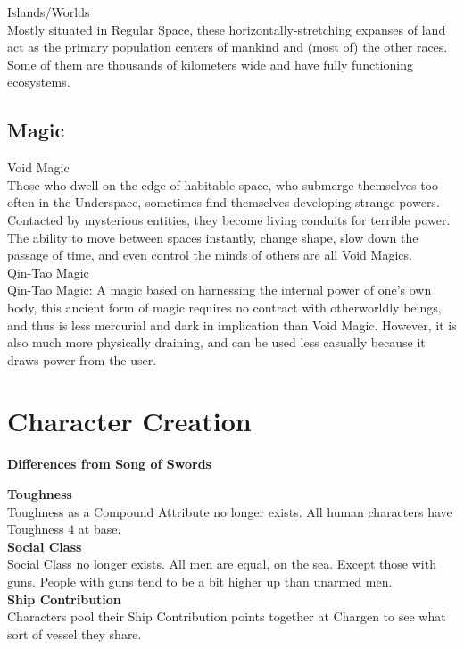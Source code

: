 \documentclass[a4paper, twocolumn, openany]{book}
\begin{document}
{	{\large Islands/Worlds\\}
	Mostly situated in Regular Space, these horizontally-stretching expanses of land act as the
	primary population centers of mankind and (most of) the other races. Some of them are
	thousands of kilometers wide and have fully functioning ecosystems.\\

\section{Magic}
	{\large Void Magic\\}
	Those who dwell on the edge of habitable space, who submerge themselves too
	often in the Underspace, sometimes find themselves developing strange powers. Contacted by
	mysterious entities, they become living conduits for terrible power. The ability to move between
	spaces instantly, change shape, slow down the passage of time, and even control the minds of
	others are all Void Magics.\\

	{\large Qin-Tao Magic\\}
	Qin-Tao Magic: A magic based on harnessing the internal power of one’s own body, this ancient
	form of magic requires no contract with otherworldly beings, and thus is less mercurial and dark
	in implication than Void Magic. However, it is also much more physically draining, and can be
	used less casually because it draws power from the user.\\

\chapter{Character Creation}
{\large\bfseries Differences from Song of Swords\\}

{\bfseries Toughness\\}
Toughness as a Compound Attribute no longer exists. All human characters have Toughness 4
at base.\\

{\bfseries Social Class\\}
Social Class no longer exists. All men are equal, on the sea. Except those with guns. People
with guns tend to be a bit higher up than unarmed men.\\

{\bfseries Ship Contribution\\}
Characters pool their Ship Contribution points together at Chargen to see what sort of vessel
they share.\\

}
\end{document}
